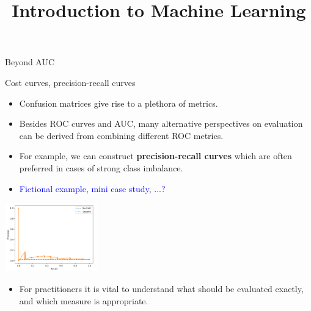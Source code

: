 \documentclass[11pt,compress,t,notes=noshow, xcolor=table]{beamer}
\title{Introduction to Machine Learning}
\institute{\href{https://compstat-lmu.github.io/lecture_i2ml/}{compstat-lmu.github.io/lecture\_i2ml}}
\date{}
\begin{document}








\begin{vbframe}{Beyond AUC}

Cost curves, precision-recall curves

\begin{itemize}
  \item Confusion matrices give rise to a plethora of metrics.
  \item Besides ROC curves and AUC, many alternative perspectives on evaluation 
  can be derived from combining different ROC metrics.
  \item For example, we can construct \textbf{precision-recall curves} which are 
  often preferred in cases of strong class imbalance.
  \item \textcolor{blue}{Fictional example, mini case study, ...?}
\end{itemize} 

\centering 
\includegraphics[width=0.3\textwidth]{figure_man/placeholder_precision_recall} 

\begin{itemize}
  \item For practitioners it is vital to understand what should be 
  evaluated exactly, and which measure is appropriate.  
\end{itemize}

\end{vbframe}
\end{document}
